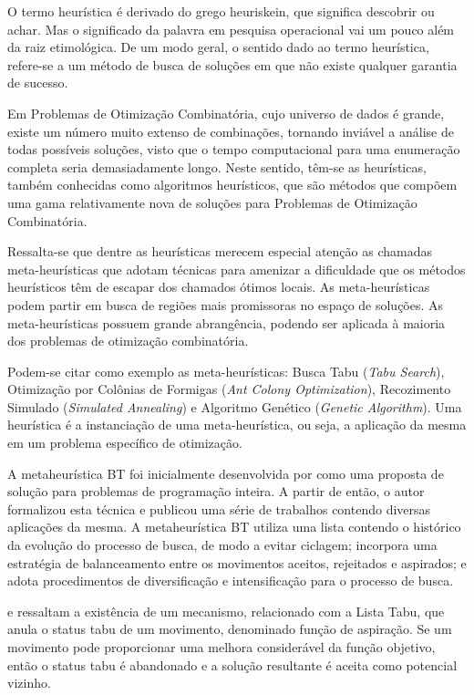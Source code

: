 O termo heurística é derivado do grego heuriskein, que significa descobrir ou achar. Mas o significado da 
palavra em pesquisa operacional vai um pouco além da raiz etimológica. De um modo geral, o sentido dado ao termo heurística, refere-se a um método de busca de soluções em que não existe qualquer garantia de sucesso.\par


\cite{leonardo}Em Problemas de Otimização Combinatória, cujo universo de dados é grande, existe um número muito extenso de combinações, tornando inviável a análise de todas possíveis soluções, visto que o tempo computacional para uma enumeração completa seria demasiadamente longo. Neste sentido, têm-se as heurísticas, também conhecidas como algoritmos heurísticos, que são métodos que compõem uma gama relativamente nova de soluções para Problemas de Otimização Combinatória. 


Ressalta-se que dentre as heurísticas merecem especial atenção as chamadas meta-heurísticas que adotam técnicas para amenizar a dificuldade que os métodos heurísticos têm de escapar dos chamados ótimos locais. As meta-heurísticas podem partir em busca de regiões mais promissoras no espaço de soluções. As meta-heurísticas possuem grande abrangência, podendo ser aplicada à maioria dos problemas de otimização combinatória.\par

Podem-se citar como exemplo as meta-heurísticas: Busca Tabu (\textit{Tabu Search}), Otimização por Colônias de Formigas (\textit{Ant Colony Optimization}), Recozimento Simulado (\textit{Simulated Annealing}) e Algoritmo Genético (\textit{Genetic Algorithm}). Uma heurística é a instanciação de uma meta-heurística, ou seja, a aplicação da mesma em um problema específico de otimização.\par



A metaheurística BT foi inicialmente desenvolvida por \cite{Glover (1986)} como uma proposta de
solução para problemas de programação inteira. A partir de então, o autor formalizou esta
técnica e publicou uma série de trabalhos contendo diversas aplicações da mesma. A
metaheurística BT utiliza uma lista contendo o histórico da evolução do processo de busca, de
modo a evitar ciclagem; incorpora uma estratégia de balanceamento entre os movimentos
aceitos, rejeitados e aspirados; e adota procedimentos de diversificação e intensificação para o
processo de busca.\par
\cite{Souza (2000)} e \cite{White et al. (2004)} ressaltam a existência de um mecanismo, relacionado com
a Lista Tabu, que anula o status tabu de um movimento, denominado função de aspiração. Se
um movimento pode proporcionar uma melhora considerável da função objetivo, então o
status tabu é abandonado e a solução resultante é aceita como potencial vizinho.

